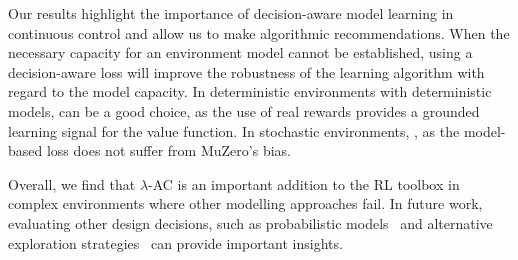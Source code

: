 Our results highlight the importance of decision-aware model learning in continuous control and allow us to make algorithmic recommendations.
When the necessary capacity for an environment model cannot be established, using a decision-aware loss will improve the robustness of the learning algorithm with regard to the model capacity.
In deterministic environments with deterministic models,  can be a good choice, as the use of real rewards provides a grounded learning signal for the value function.
In stochastic environments, , as the model-based loss does not suffer from MuZero's bias.

Overall, we find that $\lambda$-AC is an important addition to the RL toolbox in complex environments where other modelling approaches fail.
In future work, evaluating other design decisions, such as probabilistic models~\parencite{ghugare2023simplifying} and alternative exploration strategies~\parencite{tdmpc,guo2022byolexplore} can provide important insights.